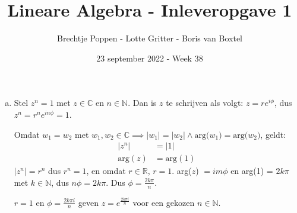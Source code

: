 \documentclass[12pt, a4paper]{article}
\begin{document}
\title{Lineare Algebra - Inleveropgave 1}
\author{Brechtje Poppen - Lotte Gritter - Boris van Boxtel}
\date{23 september 2022 - Week 38} 

\maketitle
{}

\begin{enumerate}[(a).]
    \item \label{opdrachta}
    Stel $z^n = 1$ met $z \in \mathbb{C}$ en $n \in \mathbb{N}$. Dan is $z$ te schrijven als volgt: $z = re^{i\phi}$, dus $z^n = r^ne^{in\phi} = 1$.

    Omdat $w_1 = w_2$ met $w_1,w_2 \in \mathbb{C} \implies |w_1|=|w_2| \land \text{arg($w_1$)} = \text{arg($w_2$)}$, geldt:
    \begin{equation}
        \begin{split}
            |z^n| &= |1| \\
            \text{arg}(z) &= \text{arg}(1)
        \end{split}
    \end{equation}
    $|z^n| = r^n$ dus $r^n = 1$, en omdat $r \in \mathbb{R}$, $r = 1$. arg($z$) $= im\phi$ en arg(1) = $2k\pi$ met $k \in \mathbb{N}$, dus $n\phi = 2k\pi$. Dus $\phi = \frac{2k\pi}{n}$.

    $r = 1$ en $\phi = \frac{2k\pi i}{n}$ geven $z = e^{\frac{2k\pi i}{n}}$ voor een gekozen $n \in \mathbb{N}$.


\end{enumerate}
\end{document}
